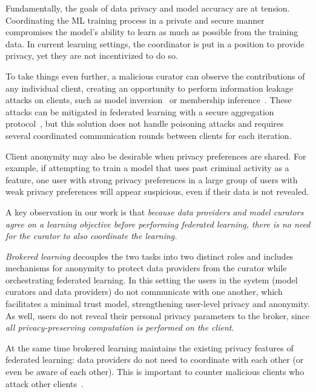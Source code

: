Fundamentally, the goals of data privacy and model accuracy are at
tension. Coordinating the ML training process in a private and secure
manner compromises the model's ability to learn as much as possible
from the training data. In current learning settings, the coordinator
is put in a position to provide privacy, yet they are not incentivized
to do so.

To take things even further, a malicious curator can observe the
contributions of any individual client, creating an opportunity to
perform information leakage~\cite{Hitaj:2017} attacks on clients, such
as model inversion~\cite{Fredrikson:2014, Fredrikson:2015} or
membership inference~\cite{Shokri:2017}. These attacks can be
mitigated in federated learning with a secure aggregation
protocol~\cite{Bonawitz:2017}, but this solution does not handle
poisoning attacks and requires several coordinated communication
rounds between clients for each iteration.

Client anonymity may also be desirable when privacy preferences are
shared. For example, if attempting to train a model that uses past
criminal activity as a feature, one user with strong privacy
preferences in a large group of users with weak privacy preferences
will appear suspicious, even if their data is not
revealed. 


A key observation in our work is that \emph{because data providers and model
curators agree on a learning objective before performing federated
learning, there is no need for the curator to also coordinate the
learning.}

\emph{Brokered learning} decouples the two tasks into two distinct
roles and includes mechanisms for anonymity to protect data providers
from the curator while orchestrating federated learning. In this
setting the users in the system (model curators and data providers) do
not communicate with one another, which facilitates a minimal trust
model, strengthening user-level privacy and anonymity. As well, users
do not reveal their personal privacy parameters to the broker, since 
\emph{all privacy-preserving computation is performed on the client}.

At the same time brokered learning maintains the existing privacy
features of federated learning: data providers do not need to
coordinate with each other (or even be aware of each other).
This is important to counter malicious clients who attack
other clients~\cite{Hitaj:2017}.

